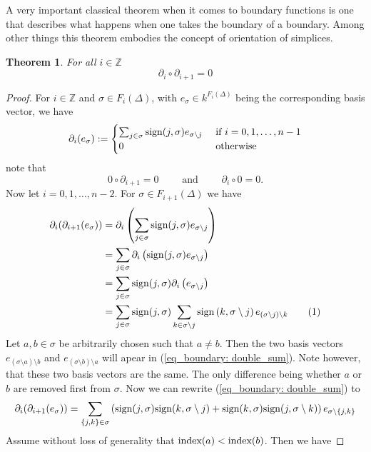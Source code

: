 \documentclass[11pt,a4paper,twoside]{report}
\newtheorem{mythm}{Theorem}[chapter]
\newcommand\numberthis{\addtocounter{equation}{1}\tag{\theequation}}
\begin{document}
A very important classical theorem when it comes to boundary functions is one that describes what happens when one takes the boundary of a boundary. Among other things this theorem embodies the concept of orientation of simplices.
\begin{mythm}\label{thm:boundary}
For all $i\in\mathbb{Z}$ 
\begin{equation*}
\partial_i\circ\partial_{i+1}=0
\end{equation*}
\end{mythm}
\begin{proof}
For $i\in\mathbb{Z}$ and $\sigma\in F_i(\Delta)$, with $e_\sigma\in k^{F_i(\Delta)}$ being the corresponding basis vector, we have 
\begin{equation*}
\partial_i(e_\sigma):=
\begin{cases}
\sum_{j\in\sigma}\textnormal{sign}(j,\sigma)e_{\sigma\setminus j} & \textnormal{ if } i=0,1,\dots,n-1 \\
0 & \textnormal{ otherwise}
\end{cases}
\end{equation*}
note that 
\begin{equation*}
0\circ\partial_{i+1}=0 \qquad \text{ and } \qquad \partial_i\circ 0 = 0.
\end{equation*}
Now let $i=0,1,\dots,n-2$. For $\sigma\in F_{i+1}(\Delta)$ we have
\begin{align*}
\partial_i(\partial_{i+1}(e_\sigma))&=\partial_i\left(\sum_{j\in\sigma}\textnormal{sign}(j,\sigma)e_{\sigma\setminus j}\right) \\
&=\sum_{j\in\sigma}\partial_i\left(\textnormal{sign}(j,\sigma)e_{\sigma\setminus j}\right)\\
&=\sum_{j\in\sigma}\textnormal{sign}(j,\sigma)\partial_i\left(e_{\sigma\setminus j}\right)\\
&=\sum_{j\in\sigma}\textnormal{sign}(j,\sigma)\sum_{k\in\sigma\setminus j}\textnormal{sign}\left(k,\sigma\setminus j\right)e_{(\sigma\setminus j)\setminus k}\numberthis \label{eq_boundary: double_sum}\\
\end{align*}
Let $a,b\in\sigma$ be arbitrarily chosen such that $a\not=b$. Then the two basis vectors $e_{(\sigma\setminus a)\setminus b}$ and $e_{(\sigma\setminus b)\setminus a}$ will apear in (\ref{eq_boundary: double_sum}). Note however, that these two basis vectors are the same. The only difference being whether $a$ or $b$ are removed first from $\sigma$. Now we can rewrite (\ref{eq_boundary: double_sum}) to
\begin{equation}
\partial_i(\partial_{i+1}(e_\sigma))=\sum_{\{j,k\}\in\sigma}\left(\textnormal{sign}(j,\sigma)\textnormal{sign}(k,\sigma\setminus j) + \textnormal{sign}(k,\sigma)\textnormal{sign}(j,\sigma\setminus k)\right)e_{\sigma\setminus\{j,k\}} \label{eq_boundary: 0}
\end{equation}
Assume without loss of generality that $\textnormal{index}(a)<\textnormal{index}(b)$. Then we have 


\end{proof}
\end{document}
